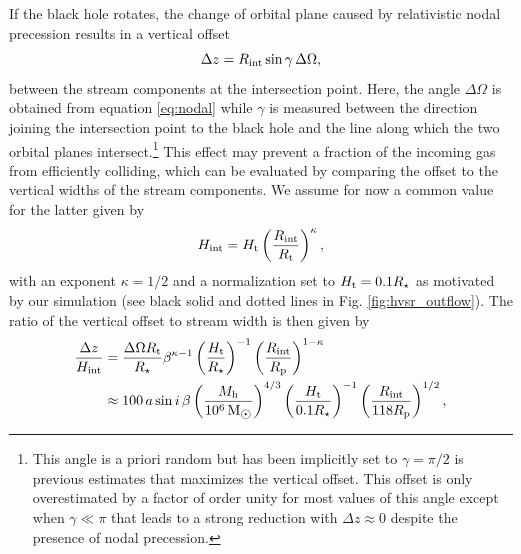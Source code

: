 \documentclass[a4paper,fleqn,usenatbib]{mnras}
\newcommand{\be}{\begin{equation}}
\newcommand{\ee}{\end{equation}}
\newcommand{\rstar}{R_{\star}}
\newcommand{\rp}{R_{\rm p}}
\newcommand{\rt}{R_{\rm t}}
\newcommand{\rint}{R_{\rm int}}
\newcommand{\mh}{M_{\rm h}}
\def\msun{\, \mathrm{M}_{\hbox{$\odot$}}}
\begin{document}
If the black hole rotates, the change of orbital plane caused by relativistic nodal precession results in a vertical offset 
\be
\Delta z =  \rint \sin \gamma \, \Delta \Omega,
\label{eq:offset}
\ee
between the stream components at the intersection point. Here, the angle $\Delta \Omega$ is obtained from equation \eqref{eq:nodal} while $\gamma$ is measured between the direction joining the intersection point to the black hole and the line along which the two orbital planes intersect.\footnote{This angle is a priori random but has been implicitly set to $\gamma = \pi/2$ is previous estimates that maximizes the vertical offset. This offset is only overestimated by a factor of order unity for most values of this angle except when $\gamma \ll \pi$ that leads to a strong reduction with $\Delta z \approx 0$ despite the presence of nodal precession.} This effect may prevent a fraction of the incoming gas from efficiently colliding, which can be evaluated by comparing the offset to the vertical widths of the stream components. We assume for now a common value for the latter given by
\be
H_{\rm int} = H_{\rm t} \left( \frac{R_{\rm int}}{\rt} \right)^{\kappa},
\label{eq:width}
\ee
with an exponent $\kappa = 1/2$ and a normalization set to $H_{\rm t} = 0.1 \rstar$ as motivated by our simulation (see black solid and dotted lines in Fig. \ref{fig:hvsr_outflow}). The ratio of the vertical offset to stream width is then given by
\be
\begin{split}
\frac{\Delta z}{H_{\rm int}} & =  \frac{\Delta \Omega \rt}{\rstar} \beta^{\kappa -1} \left( \frac{H_{\rm t}}{\rstar} \right)^{-1}  \left( \frac{\rint}{\rp} \right)^{1-\kappa}  \\
& \approx 100 \, a  \sin i \, \beta \left( \frac{\mh}{10^6 \msun} \right)^{4/3}  \left( \frac{H_{\rm t}}{0.1 \rstar} \right)^{-1} \left( \frac{\rint}{118 \rp} \right)^{1/2},
\end{split}
\label{eq:dzovh}
\ee
\end{document}
